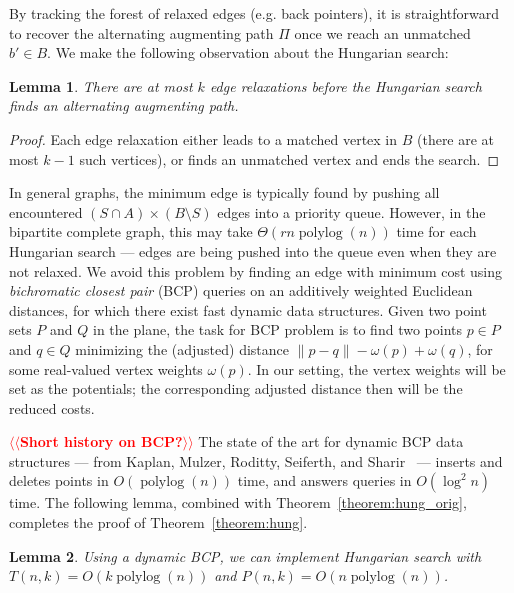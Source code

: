 \documentclass[11pt]{article}
\makeatletter
\def\polylog{\mathop{\mathrm{polylog}}}
\theoremstyle{plain}
\newtheorem{lemma}{Lemma}
\def\n@te#1{\textsf{\boldmath \textbf{$\langle\!\langle$#1$\rangle\!\rangle$}}\leavevmode}
\def\note#1{\textcolor{red}{\n@te{#1}}}
\makeatother
\begin{document}
By tracking the forest of relaxed edges (e.g. back pointers), it is
straightforward to recover the alternating augmenting path $\Pi$ once we reach
an unmatched $b' \in B$.
We make the following observation about the Hungarian search:

\begin{lemma}
\label{lemma:hungsearch_length}
There are at most $k$ edge relaxations before the Hungarian search finds an
alternating augmenting path.
\end{lemma}

\begin{proof}
Each edge relaxation either leads to a matched vertex in $B$ (there are at most
$k-1$ such vertices), or finds an unmatched vertex and ends the search.
\end{proof}

In general graphs, the minimum edge is typically found by pushing all
encountered $(S \cap A) \times (B \setminus S)$ edges into a priority queue.
However, in the bipartite complete graph, this may take $\Theta(rn\polylog(n))$
time for each Hungarian search --- edges are being pushed into the queue even when
they are not relaxed.
We avoid this problem by finding an  edge with minimum cost using  \emph{bichromatic
closest pair} (BCP) queries on an additively weighted Euclidean distances,
for which there exist fast %
dynamic data structures.
Given two point sets
$P$ and $Q$ in the plane,
the task for BCP problem is to find two points $p \in P$ and $q \in Q$ minimizing the (adjusted) distance
$\|p - q\| - \omega(p) + \omega(q)$, for some real-valued vertex weights
$\omega(p)$.
In our setting, the vertex weights will be set as the potentials; the corresponding adjusted distance then will be the reduced costs.

\note{Short history on BCP?}
The state of the art for dynamic BCP data structures --- from Kaplan, Mulzer,
Roditty, Seiferth, and Sharir~\cite{KMRSS17} --- inserts and deletes points in
$O(\polylog(n))$ time, and answers queries in $O(\log^2 n)$ time.
The following lemma, combined with Theorem~\ref{theorem:hung_orig}, completes
the proof of Theorem~\ref{theorem:hung}.

\begin{lemma}
\label{lemma:hs_time}
Using a dynamic BCP, we can implement Hungarian search with
$T(n, k) = O(k\polylog(n))$ and $P(n, k) = O(n\polylog(n))$.
\end{lemma}
\end{document}
